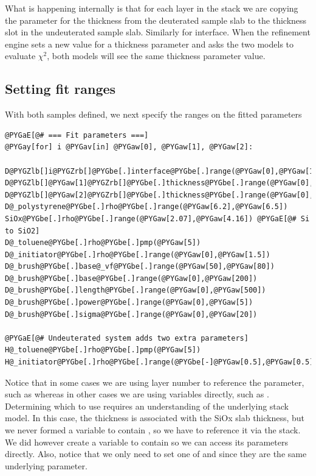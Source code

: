 \documentclass[letterpaper,10pt,english]{sphinxmanual}
\begin{document}
What is happening internally is that for each layer in the stack we are
copying the parameter for the thickness from the deuterated sample
slab to the thickness slot in the undeuterated sample slab.  Similarly
for interface.  When the refinement engine sets a new value for a
thickness parameter and asks the two models to evaluate $\chi^2$, both
models will see the same thickness parameter value.


\subsection{Setting fit ranges}
\label{examples/polymer/tethered:setting-fit-ranges}
With both samples defined, we next specify the ranges on the fitted
parameters

\begin{Verbatim}[commandchars=@\[\]]
@PYGaE[@# === Fit parameters ===]
@PYGay[for] i @PYGav[in] @PYGaw[0], @PYGaw[1], @PYGaw[2]:
    D@PYGZlb[]i@PYGZrb[]@PYGbe[.]interface@PYGbe[.]range(@PYGaw[0],@PYGaw[100])
D@PYGZlb[]@PYGaw[1]@PYGZrb[]@PYGbe[.]thickness@PYGbe[.]range(@PYGaw[0],@PYGaw[200])
D@PYGZlb[]@PYGaw[2]@PYGZrb[]@PYGbe[.]thickness@PYGbe[.]range(@PYGaw[0],@PYGaw[200])
D@_polystyrene@PYGbe[.]rho@PYGbe[.]range(@PYGaw[6.2],@PYGaw[6.5])
SiOx@PYGbe[.]rho@PYGbe[.]range(@PYGaw[2.07],@PYGaw[4.16]) @PYGaE[@# Si to SiO2]
D@_toluene@PYGbe[.]rho@PYGbe[.]pmp(@PYGaw[5])
D@_initiator@PYGbe[.]rho@PYGbe[.]range(@PYGaw[0],@PYGaw[1.5])
D@_brush@PYGbe[.]base@_vf@PYGbe[.]range(@PYGaw[50],@PYGaw[80])
D@_brush@PYGbe[.]base@PYGbe[.]range(@PYGaw[0],@PYGaw[200])
D@_brush@PYGbe[.]length@PYGbe[.]range(@PYGaw[0],@PYGaw[500])
D@_brush@PYGbe[.]power@PYGbe[.]range(@PYGaw[0],@PYGaw[5])
D@_brush@PYGbe[.]sigma@PYGbe[.]range(@PYGaw[0],@PYGaw[20])

@PYGaE[@# Undeuterated system adds two extra parameters]
H@_toluene@PYGbe[.]rho@PYGbe[.]pmp(@PYGaw[5])
H@_initiator@PYGbe[.]rho@PYGbe[.]range(@PYGbe[-]@PYGaw[0.5],@PYGaw[0.5])
\end{Verbatim}

Notice that in some cases we are using layer number to reference the
parameter, such as  whereas in other cases we are using
variables directly, such as .  Determining which to
use requires an understanding of the underlying stack model.  In this
case, the thickness is associated with the SiOx slab thickness, but
we never formed a variable to contain , so we
have to reference it via the stack.   We did however create a variable
to contain  so we can access its parameters
directly.  Also, notice that we only need to set one of 
and  since they are the same underlying parameter.
\end{document}
